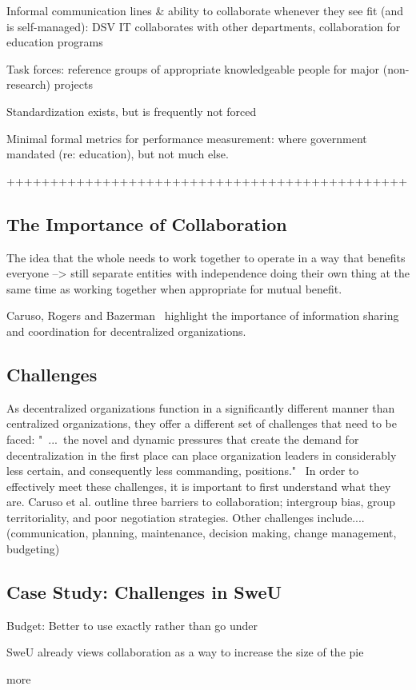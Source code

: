 Informal communication lines \& ability to collaborate whenever they see fit (and is self-managed): DSV IT collaborates with other departments, collaboration for education programs

Task forces: reference groups of appropriate knowledgeable people for major (non-research) projects

Standardization exists, but is frequently not forced

Minimal formal metrics for performance measurement: where government mandated (re: education), but not much else.  


++++++++++++++++++++++++++++++++++++++++++++++



\subsection{The Importance of Collaboration}
The idea that the whole needs to work together to operate in a way that benefits everyone --> still separate entities with independence doing their own thing at the same time as working together when appropriate for mutual benefit.

Caruso, Rogers and Bazerman~\cite{caruso2008boundaries} highlight the importance of information sharing and coordination for decentralized organizations. 
        
\subsection{Challenges}
As decentralized organizations function in a significantly different manner than centralized organizations, they offer a different set of challenges that need to be faced: "~...~the novel and dynamic pressures that create the demand for decentralization in the first place can place organization leaders in considerably less certain, and consequently less commanding, positions."~\cite{caruso2008boundaries} In order to effectively meet these challenges, it is important to first understand what they are. Caruso et al. outline three barriers to collaboration; intergroup bias, group territoriality, and poor negotiation  strategies. Other challenges include.... (communication, planning, maintenance, decision making, change management, budgeting)

\subsection{Case Study: Challenges in SweU}

Budget: Better to use exactly rather than go under

SweU already views collaboration as a way to increase the size of the pie

more